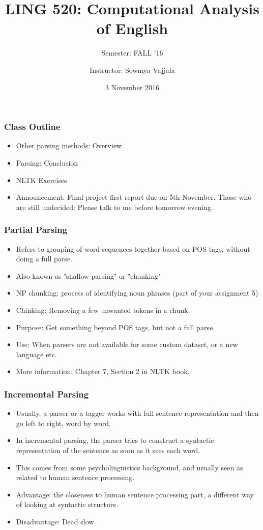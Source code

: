 \documentclass{beamer}
\author[Sowmya Vajjala]{Instructor: Sowmya Vajjala}
\title[LING 520]{LING 520: Computational Analysis of English}
\subtitle{Semester: FALL '16}
\date{3 November 2016}
\institute{Iowa State University, USA}
\begin{document}
\begin{frame}\titlepage
\end{frame}

\begin{frame}
\frametitle{Class Outline}
\begin{itemize}
\item Other parsing methods: Overview
\item Parsing: Conclusion
\item NLTK Exercises
\item Announcement: Final project first report due on 5th November. Those who are still undecided: Please talk to me before tomorrow evening.
\end{itemize}
\end{frame}

\begin{frame}
\frametitle{Partial Parsing}
\begin{itemize}
\item Refers to grouping of word sequences together based on POS tags, without doing a full parse.
\item Also known as "shallow parsing" or "chunking"
\item NP chunking: process of identifying noun phrases (part of your assignment 5)
\item Chinking: Removing a few unwanted tokens in a chunk.
\item Purpose: Get something beyond POS tags, but not a full parse. 
\item Use: When parsers are not available for some custom dataset, or a new language etc.
\item More information: Chapter 7, Section 2 in NLTK book.
\end{itemize}
\end{frame}

\begin{frame}
\frametitle{Incremental Parsing}
\begin{itemize}
\item Usually, a parser or a tagger works with full sentence representation and then go left to right, word by word.
\item In incremental parsing, the parser tries to construct a syntactic representation of the sentence as soon as it sees each word.
\item This comes from some psycholinguistics background, and usually seen as related to human sentence processing. \pause
\item Advantage: the closeness to human sentence processing part, a different way of looking at syntactic structure. 
\item Disadvantage: Dead slow
\end{itemize}
\end{frame}
\end{document}
